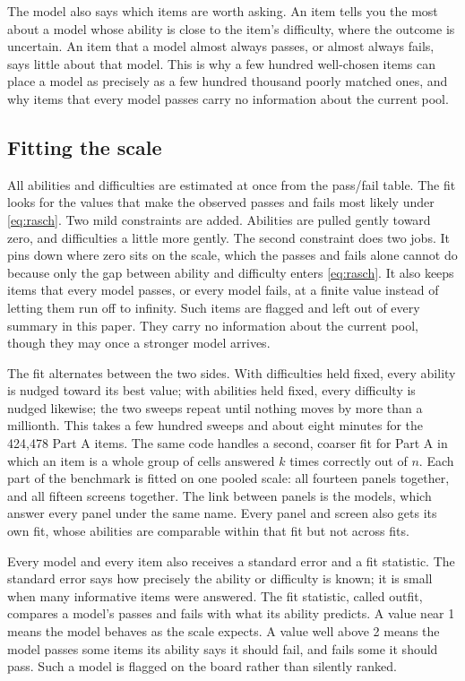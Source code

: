 \documentclass[]{style}
\begin{document}
The model also says which items are worth asking. An item tells you the most about a
model whose ability is close to the item's difficulty, where the outcome is uncertain. An
item that a model almost always passes, or almost always fails, says little about that
model. This is why a few hundred well-chosen items can place a model as precisely as a
few hundred thousand poorly matched ones, and why items that every model passes carry no
information about the current pool.

\subsection{Fitting the scale}
\label{sec:fitting}

All abilities and difficulties are estimated at once from the pass/fail table. The fit
looks for the values that make the observed passes and fails most likely under
\cref{eq:rasch}. Two mild constraints are added. Abilities are pulled gently toward zero,
and difficulties a little more gently. The second constraint does two jobs. It pins down
where zero sits on the scale, which the passes and fails alone cannot do because only the
gap between ability and difficulty enters \cref{eq:rasch}. It also keeps items that every
model passes, or every model fails, at a finite value instead of letting them run off to
infinity. Such items are flagged and left out of every summary in this paper. They carry
no information about the current pool, though they may once a stronger model arrives.

The fit alternates between the two sides. With difficulties held fixed, every ability is
nudged toward its best value; with abilities held fixed, every difficulty is nudged
likewise; the two sweeps repeat until nothing moves by more than a millionth. This takes
a few hundred sweeps and about eight minutes for the 424,478 Part A items. The same code
handles a second, coarser fit for Part A in which an item is a whole group of cells
answered $k$ times correctly out of $n$. Each part of the benchmark is fitted on one pooled
scale: all fourteen panels together, and all fifteen screens together. The link between
panels is the models, which answer every panel under the same name. Every panel and screen
also gets its own fit, whose abilities are comparable within that fit but not across fits.

Every model and every item also receives a standard error and a fit statistic. The
standard error says how precisely the ability or difficulty is known; it is small when
many informative items were answered. The fit statistic, called outfit, compares a model's
passes and fails with what its ability predicts. A value near 1 means the model behaves as
the scale expects. A value well above 2 means the model passes some items its ability says
it should fail, and fails some it should pass. Such a model is flagged on the board rather
than silently ranked.
\end{document}
